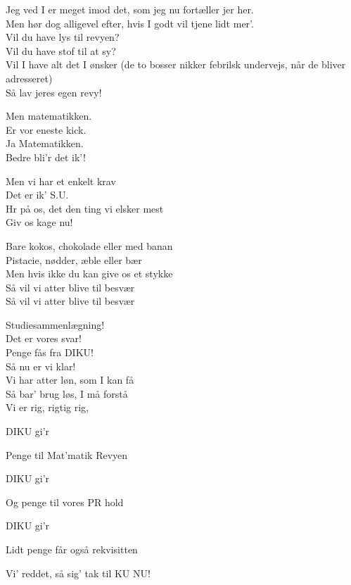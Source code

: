\documentclass[a4paper,11pt]{article}
\begin{document}
\begin{sketch}

 Jeg ved I er meget imod det, som jeg nu fortæller jer her. \\
Men hør dog alligevel efter, hvis I godt vil tjene lidt mer'. \\
Vil du have lys til revyen? \\
Vil du have stof til at sy? \\
Vil I have alt det I ønsker (de to bosser nikker febrilsk undervejs, når de bliver adresseret) \\
Så lav jeres egen revy!



 Men matematikken. \\
Er vor eneste kick. \\
Ja Matematikken. \\
Bedre bli'r det ik'!


 Men vi har et enkelt krav \\
Det er ik' S.U. \\
Hr på os, det den ting vi elsker mest \\
Giv os kage nu!


 Bare kokos, chokolade eller med banan \\
Pistacie, nødder, æble eller bær \\
Men hvis ikke du kan give os et stykke \\
Så vil vi atter blive til besvær \\
Så vil vi atter blive til besvær



 Studiesammenlægning! \\
Det er vores svar! \\
Penge fås fra DIKU! \\
Så nu er vi klar! \\
Vi har atter løn, som I kan få \\
Så bar' brug løs, I må forstå \\
Vi er rig, rigtig rig, \\


 DIKU gi'r

 Penge til Mat'matik Revyen

 DIKU gi'r

 Og penge til vores PR hold

 DIKU gi'r

 Lidt penge får også rekvisitten

 Vi' reddet, så sig' tak til KU NU!
\end{sketch}
\end{document}
